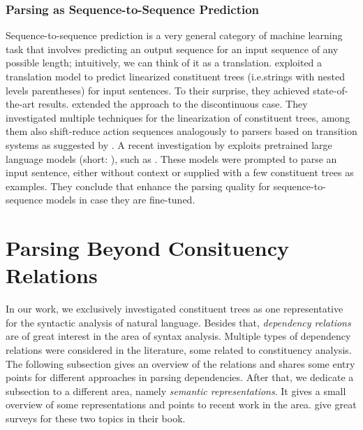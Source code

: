 \documentclass[../document.tex]{subfiles}
\begin{document}
    \subsubsection*{Parsing as Sequence-to-Sequence Prediction}
    Sequence-to-sequence prediction is a very general category of machine learning task that involves predicting an output sequence for an input sequence of any possible length; intuitively, we can think of it as a translation.
    \citet{vinyals2015grammar} exploited a translation model to predict linearized constituent trees (i.e.\@ strings with nested levels parentheses) for input sentences.
    To their surprise, they achieved state-of-the-art results.
    \citet{FerGon21b} extended the approach to the discontinuous case.
    They investigated multiple techniques for the linearization of constituent trees, among them also shift-reduce action sequences analogously to parsers based on transition systems as suggested by \citet{Ma2017DeterministicAF,liu-zhang-2017-encoder}.
    A recent investigation by \citet{bai2023constituency} exploits pretrained large language models (short: ), such as  \citep{openai2023gpt4}.
    These models were prompted to parse an input sentence, either without context or supplied with a few constituent trees as examples.
    They conclude that  enhance the parsing quality for sequence-to-sequence models in case they are fine-tuned.
    
    \section{Parsing Beyond Consituency Relations}\label{sec:literature:beyond}
    In our work, we exclusively investigated constituent trees as one representative for the syntactic analysis of natural language.
    Besides that, \emph{dependency relations} are of great interest in the area of syntax analysis.
    Multiple types of dependency relations were considered in the literature, some related to constituency analysis.
    The following subsection gives an overview of the relations and shares some entry points for different approaches in parsing dependencies.
    After that, we dedicate a subsection to a different area, namely \emph{semantic representations}.
    It gives a small overview of some representations and points to recent work in the area.
    \citet[Sections 18 and 19]{Jur23} give great surveys for these two topics in their book.
\end{document}
